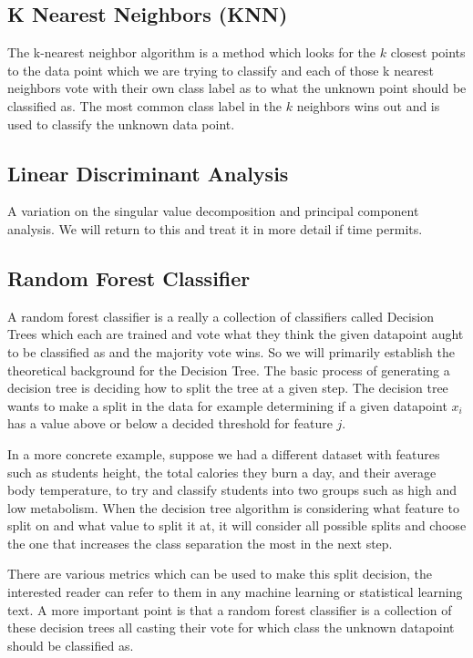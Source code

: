 \documentclass[11pt]{amsart}
\begin{document}
\subsection{K Nearest Neighbors (KNN)}

The k-nearest neighbor algorithm is a method which looks for the $k$ closest points to the data point which we are trying to classify and each of those k nearest neighbors vote with their own class label as to what the unknown point should be classified as. The most common class label in the $k$ neighbors wins out and is used to classify the unknown data point.

\subsection{Linear Discriminant Analysis }
A variation on the singular value decomposition and principal component analysis.
We will return to this and treat it in more detail if time permits.

\subsection{Random Forest Classifier}
A random forest classifier is a really a collection of classifiers called Decision Trees which each are trained and vote what they think the given datapoint aught to be classified as and the majority vote wins.
So we will primarily establish the theoretical background for the Decision Tree.
The basic process of generating a decision tree is deciding how to split the tree at a given step.
The decision tree wants to make a split in the data for example determining if a given datapoint $x_i$ has a value above or below a decided threshold for feature $j$.

In a more concrete example, suppose we had a different dataset with features such as students height, the total calories they burn a day, and their average body temperature, to try and classify students into two groups such as  high and low metabolism.
When the decision tree algorithm is considering what feature to split on and what value to split it at, it will consider all possible splits and choose the one that increases the class separation the most in the next step.

There are various metrics which can be used to make this split decision, the interested reader can refer to them in any machine learning or statistical learning text. A more important point is that a random forest classifier is a collection of these decision trees all casting their vote for which class the unknown datapoint should be classified as.
\end{document}
